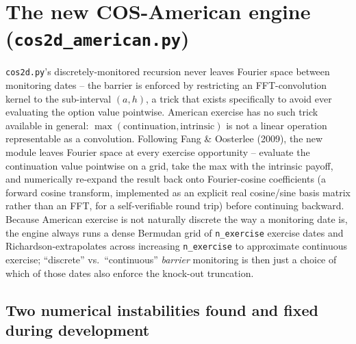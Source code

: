 \documentclass[11pt]{article}
\begin{document}
\section{The new COS-American engine (\texttt{cos2d\_american.py})}

\texttt{cos2d.py}'s discretely-monitored recursion never leaves Fourier space
between monitoring dates -- the barrier is enforced by restricting an
FFT-convolution kernel to the sub-interval $(a,h)$, a trick that exists
specifically to avoid ever evaluating the option value pointwise. American
exercise has no such trick available in general: $\max(\text{continuation},
\text{intrinsic})$ is not a linear operation representable as a convolution.
Following Fang \& Oosterlee (2009), the new module leaves Fourier space at
every exercise opportunity -- evaluate the continuation value pointwise on a
grid, take the max with the intrinsic payoff, and numerically re-expand the
result back onto Fourier-cosine coefficients (a forward cosine transform,
implemented as an explicit real cosine/sine basis matrix rather than an FFT,
for a self-verifiable round trip) before continuing backward. Because American
exercise is not naturally discrete the way a monitoring date is, the engine
always runs a dense Bermudan grid of \texttt{n\_exercise} exercise dates and
Richardson-extrapolates across increasing \texttt{n\_exercise} to approximate
continuous exercise; ``discrete'' vs.\ ``continuous'' \emph{barrier}
monitoring is then just a choice of which of those dates also enforce the
knock-out truncation.

\subsection*{Two numerical instabilities found and fixed during development}
\end{document}
